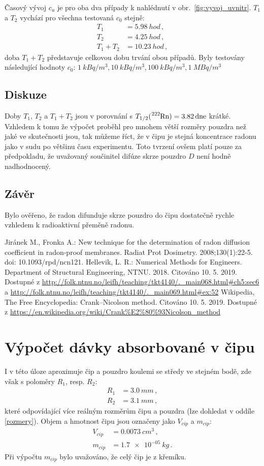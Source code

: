 \documentclass[11pt,a4paper]{article}
\begin{document}
Časový vývoj $c_u$ je pro oba dva případy k nahlédnutí v obr.~\ref{fig:vyvoj_uvnitr}. $T_1$ a $T_2$ vychází pro všechna testovaná $c_0$ stejně:
\begin{align}
	T_1&=\SI{5,98}{hod}\,,\\
	T_2&=\SI{4,25}{hod}\,,\\
	T_1+T_2&=\SI{10,23}{hod}\,,
\end{align}
doba $T_1+T_2$ představuje celkovou dobu trvání obou případů. Byly testovány následující hodnoty $c_0$: $\SI{1}{kBq/m^3}, \SI{10}{kBq/m^3}, \SI{100}{kBq/m^3}, \SI{1}{MBq/m^3}$
\subsection{Diskuze}
Doby $T_1$, $T_2$ a $T_1+T_2$ jsou v porovnání s $T_{1/2}(\ce{^{222}Rn})=\SI{3,82}{dne}$ krátké. Vzhledem k tomu že výpočet proběhl pro mnohem větší rozměry pouzdra než jaké ve skutečnosti jsou, tak můžeme říct, že v čipu je stejná koncentrace radonu jako v sudu po většinu času experimentu. Toto tvrzení ovšem platí pouze za předpokladu, že uvažovaný součinitel difúze skrze pouzdro $D$ není hodně nadhodnocený.
\subsection{Závěr}
Bylo ověřeno, že radon difunduje skrze pouzdro do čipu dostatečně rychle vzhledem k radioaktivní přeměně radonu.
\begin{thebibliography}{Mm99}
	 Jiránek M., Fronka A.: New technique for the determination of radon diffusion coefficient in radon-proof membranes. Radiat Prot Dosimetry. 2008;130(1):22-5. doi: 10.1093/rpd/ncn121.
	 Hellevik, L. R.: Numerical Methods for Engineers. Department of Structural Engineering, NTNU. 2018. Citováno 10. 5. 2019. Dostupné z \url{http://folk.ntnu.no/leifh/teaching/tkt4140/._main068.html#ch5:sec6} a \url{http://folk.ntnu.no/leifh/teaching/tkt4140/._main069.html#ex:52}
	 Wikipedia, The Free Encyclopedia: Crank–Nicolson method. Citováno 10. 5. 2019. Dostupné z \url{https://en.wikipedia.org/wiki/Crank%E2%80%93Nicolson_method}
	\end{thebibliography}
\clearpage
\section{Výpočet dávky absorbované v čipu}
I v této úloze aproximuje čip a pouzdro koulemi se středy ve stejném bodě, zde však s poloměry $R_1$, resp. $R_2$:
\begin{align}
	R_1&=\SI{3,0}{mm}\,,\\
	R_2&=\SI{3,1}{mm}\,,
\end{align}
které odpovídající více reálným rozměrům čipu a pouzdra (lze dohledat v oddíle \ref{rozmery}). Objem a hmotnost čipu jsou označeny jako $V_{cip}$ a $m_{cip}$:
\begin{align}
	V_{cip}&=\SI{0,0073}{cm^3}\,,\\
	m_{cip}&=\SI{1.7e-05}{kg}\,.
\end{align}
Při výpočtu $m_{cip}$ bylo uvažováno, že celý čip je z křemíku. 
\end{document}
